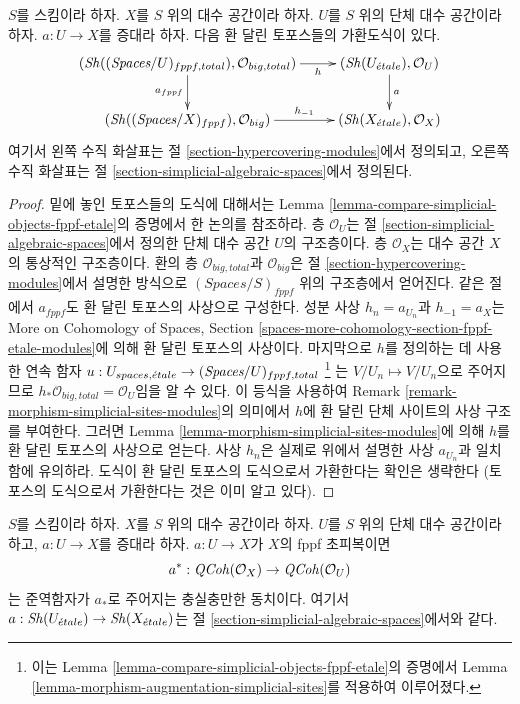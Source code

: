 \begin{lemma}
\label{lemma-compare-simplicial-objects-fppf-etale-modules}
$S$를 스킴이라 하자. $X$를 $S$ 위의 대수 공간이라 하자.
$U$를 $S$ 위의 단체 대수 공간이라 하자.
$a : U \to X$를 증대라 하자. 다음 환 달린 토포스들의 가환도식이 있다.
$$
\xymatrix{
(\Sh((\textit{Spaces}/U)_{fppf, total}), \mathcal{O}_{big, total})
\ar[r]_-h \ar[d]_{a_{fppf}} &
(\Sh(U_\etale), \mathcal{O}_U) \ar[d]^a \\
(\Sh((\textit{Spaces}/X)_{fppf}), \mathcal{O}_{big}) \ar[r]^-{h_{-1}} &
(\Sh(X_\etale), \mathcal{O}_X)
}
$$
여기서 왼쪽 수직 화살표는
절 \ref{section-hypercovering-modules}에서 정의되고,
오른쪽 수직 화살표는
절 \ref{section-simplicial-algebraic-spaces}에서 정의된다.
\end{lemma}

\begin{proof}
밑에 놓인 토포스들의 도식에 대해서는 Lemma
\ref{lemma-compare-simplicial-objects-fppf-etale}의 증명에서 한
논의를 참조하라. 층 $\mathcal{O}_U$는 절
\ref{section-simplicial-algebraic-spaces}에서 정의한
단체 대수 공간 $U$의 구조층이다. 층 $\mathcal{O}_X$는
대수 공간 $X$의 통상적인 구조층이다. 환의 층
$\mathcal{O}_{big, total}$과 $\mathcal{O}_{big}$은 절
\ref{section-hypercovering-modules}에서 설명한 방식으로
$(\textit{Spaces}/S)_{fppf}$ 위의 구조층에서 얻어진다.
같은 절에서 $a_{fppf}$도 환 달린 토포스의 사상으로 구성한다.
성분 사상 $h_n = a_{U_n}$과 $h_{-1} = a_X$는
More on Cohomology of Spaces, Section
\ref{spaces-more-cohomology-section-fppf-etale-modules}에 의해
환 달린 토포스의 사상이다. 마지막으로 $h$를 정의하는 데 사용한
연속 함자
$u : U_{spaces, {\acute{e}tale}} \to (\textit{Spaces}/U)_{fppf, total}$
\footnote{이는 Lemma
\ref{lemma-compare-simplicial-objects-fppf-etale}의 증명에서
Lemma \ref{lemma-morphism-augmentation-simplicial-sites}를
적용하여 이루어졌다.}
는 $V/U_n \mapsto V/U_n$으로 주어지므로
$h_*\mathcal{O}_{big, total} = \mathcal{O}_U$임을 알 수 있다.
이 등식을 사용하여 Remark
\ref{remark-morphism-simplicial-sites-modules}의 의미에서
$h$에 환 달린 단체 사이트의 사상 구조를 부여한다.
그러면 Lemma \ref{lemma-morphism-simplicial-sites-modules}에 의해
$h$를 환 달린 토포스의 사상으로 얻는다.
사상 $h_n$은 실제로 위에서 설명한 사상 $a_{U_n}$과 일치함에 유의하라.
도식이 환 달린 토포스의 도식으로서 가환한다는 확인은 생략한다
(토포스의 도식으로서 가환한다는 것은 이미 알고 있다).
\end{proof}

\begin{lemma}
\label{lemma-descent-qcoh-for-fppf-hypercovering}
$S$를 스킴이라 하자. $X$를 $S$ 위의 대수 공간이라 하자.
$U$를 $S$ 위의 단체 대수 공간이라 하고, $a : U \to X$를
증대라 하자. $a : U \to X$가 $X$의 fppf 초피복이면
$$
a^* : \mathit{QCoh}(\mathcal{O}_X) \to \mathit{QCoh}(\mathcal{O}_U)
$$
는 준역함자가 $a_*$로 주어지는 충실충만한 동치이다.
여기서 $a : \mathop{\mathit{Sh}}\nolimits(U_{\acute{e}tale}) \to \mathop{\mathit{Sh}}\nolimits(X_{\acute{e}tale})$는
절 \ref{section-simplicial-algebraic-spaces}에서와 같다.
\end{lemma}

